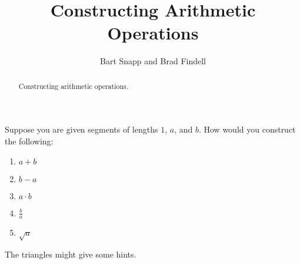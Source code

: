 \documentclass[nooutcomes]{ximera}
\title{Constructing Arithmetic Operations}
\author{Bart Snapp and Brad Findell}
\begin{document}
\begin{abstract}
Constructing arithmetic operations.
\end{abstract}
\maketitle



\begin{problem}
Suppose you are given segments of lengths $1$, $a$, and $b$.  How would you construct the following: 

\begin{enumerate}
\item $a+b$
\item $b-a$
\item $a\cdot b$
\item $\frac{b}{a}$
\item $\sqrt{a}$
\end{enumerate}  

The triangles might give some hints. 



\end{problem}
\end{document}
